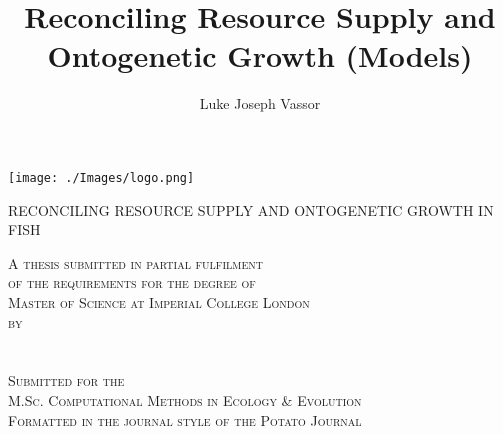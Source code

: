 \documentclass[a4paper]{article} %
\title{Reconciling Resource Supply and Ontogenetic Growth (Models)}
\author{Luke Joseph Vassor}
\begin{document}
\begin{titlepage}
    
    \texttt{[image: ./Images/logo.png]}\\%
     
    
    \center %
    
    
    \makeatletter
    \linespread{1.5} %
        {\huge{RECONCILING RESOURCE SUPPLY AND ONTOGENETIC GROWTH IN FISH}\par} %
    \vspace{2.5cm} %

    \textsc{A thesis submitted in partial fulfilment \\ of the requirements for the degree of \\ Master of Science at Imperial College London \\ by \\ \ }\\[2.5cm]
    \textsc{\Large \@author}\\[2.5cm]
    \textsc{Submitted for the \\ M.Sc. Computational Methods in Ecology \& Evolution \\ Formatted in the journal style of the Potato Journal \\ \ }\\[2cm]


\end{titlepage}
\end{document}
